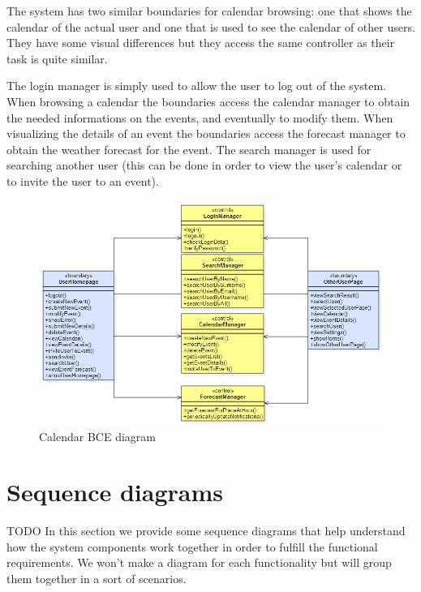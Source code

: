 \documentclass[10pt,a4paper,titlepage]{article}
\begin{document}
The system has two similar boundaries for calendar browsing: one that shows the calendar of the actual user and one that is used to see the calendar of other users. They have some visual differences but they access the same controller as their task is quite similar.

The login manager is simply used to allow the user to log out of the system.
When browsing a calendar the boundaries access the calendar manager to obtain the needed informations on the events, and eventually to modify them.
When visualizing the details of an event the boundaries access the forecast manager to obtain the weather forecast for the event.
The search manager is used for searching another user (this can be done in order to view the user's calendar or to invite the user to an event).
\begin{figure}[h]
\centering
\includegraphics[width=\linewidth]{./bce/calendar_bce}
\caption[calendar bce]{Calendar BCE diagram}
\label{fig:calendar_bce}
\end{figure}

\clearpage
\section{Sequence diagrams}
TODO
In this section we provide some sequence diagrams that help understand how the system components work together in order to fulfill the functional requirements. We won't make a diagram for each functionality but will group them together in a sort of scenarios.
\end{document}
